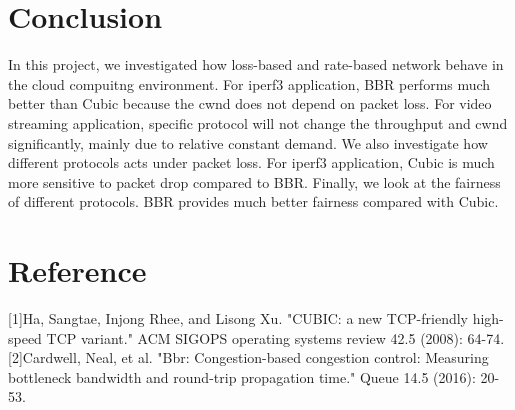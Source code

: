 \documentclass{article}
\begin{document}
\section{Conclusion}
In this project, we investigated how loss-based and rate-based network behave in the cloud compuitng environment. For iperf3 application, BBR performs much better than Cubic because the cwnd does not depend on packet loss.
For video streaming application, specific protocol will not change the throughput and cwnd significantly, mainly due to relative constant demand. We also investigate how different protocols acts under packet loss. For iperf3 application,
Cubic is much more sensitive to packet drop compared to BBR. Finally, we look at the fairness of different protocols. BBR provides much better fairness compared with Cubic.

\section{Reference}
[1]Ha, Sangtae, Injong Rhee, and Lisong Xu. "CUBIC: a new TCP-friendly high-speed TCP variant." ACM SIGOPS operating systems review 42.5 (2008): 64-74.
\\[6pt]
[2]Cardwell, Neal, et al. "Bbr: Congestion-based congestion control: Measuring bottleneck bandwidth and round-trip propagation time." Queue 14.5 (2016): 20-53.
\\[6pt]
\end{document}
